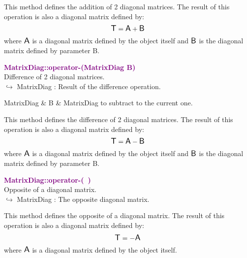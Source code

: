 This method defines the addition of 2 diagonal matrices.
The result of this operation is also a diagonal matrix defined by:
\begin{equation*}
\mbox{\large\ensuremath{\mathsf{T}}} = \mbox{\large\ensuremath{\mathsf{A}}} + \mbox{\large\ensuremath{\mathsf{B}}}
\end{equation*}
where $\mbox{\large\ensuremath{\mathsf{A}}}$ is a diagonal matrix defined by the object itself and $\mbox{\large\ensuremath{\mathsf{B}}}$ is the diagonal matrix defined by parameter B.

\textcolor{purple}{\textbf{MatrixDiag::operator-(MatrixDiag B)}}\label{MatrixDiag::operator-(MatrixDiag B)}\\
Difference of 2 diagonal matrices.\\ \hspace*{10mm}$\hookrightarrow$ MatrixDiag : Result of the difference operation.

\begin{tcolorbox}[width=\textwidth,myArgs,tabularx={ll|R}]
MatrixDiag & B & MatrixDiag to subtract to the current one.
\end{tcolorbox}

This method defines the difference of 2 diagonal matrices.
The result of this operation is also a diagonal matrix defined by:
\begin{equation*}
\mbox{\large\ensuremath{\mathsf{T}}} = \mbox{\large\ensuremath{\mathsf{A}}} - \mbox{\large\ensuremath{\mathsf{B}}}
\end{equation*}
where $\mbox{\large\ensuremath{\mathsf{A}}}$ is a diagonal matrix defined by the object itself and $\mbox{\large\ensuremath{\mathsf{B}}}$ is the diagonal matrix defined by parameter B.

\textcolor{purple}{\textbf{MatrixDiag::operator-(~)}}\label{MatrixDiag::operator-()}\\
Opposite of a diagonal matrix.\\ \hspace*{10mm}$\hookrightarrow$ MatrixDiag : The opposite diagonal matrix.

This method defines the opposite of a diagonal matrix.
The result of this operation is also a diagonal matrix defined by:
\begin{equation*}
\mbox{\large\ensuremath{\mathsf{T}}} = - \mbox{\large\ensuremath{\mathsf{A}}}
\end{equation*}
where $\mbox{\large\ensuremath{\mathsf{A}}}$ is a diagonal matrix defined by the object itself.

